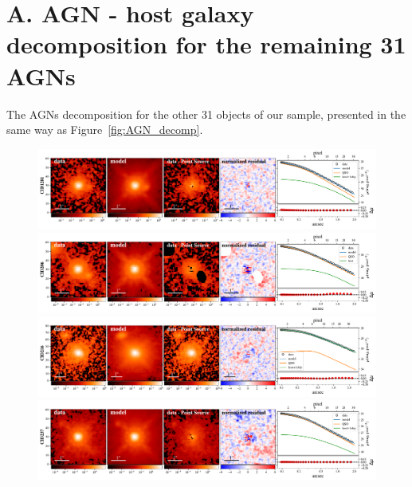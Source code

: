 \documentclass[apj]{emulateapj}
\begin{document}



\newpage

\appendix

\section{A. AGN - host galaxy decomposition for the remaining 31 AGNs}\label{sec:restsample}
The AGNs decomposition for the other 31 objects of our sample, presented in the same way as Figure~\ref{fig:AGN_decomp}.

\begin{figure}[ht]
\centering
{
\includegraphics[height=0.25\textwidth]{fig/best_fit_CID1281_SB_profile.pdf}
\includegraphics[height=0.25\textwidth]{fig/best_fit_CID206_SB_profile.pdf}
\includegraphics[height=0.25\textwidth]{fig/best_fit_CID216_SB_profile.pdf}
\includegraphics[height=0.25\textwidth]{fig/best_fit_CID237_SB_profile.pdf}
}
\end{figure} 
\end{document}
